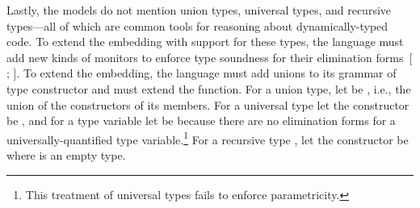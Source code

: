 \documentclass[screen=true, 10pt, acmsmall]{acmart}
\makeatletter
\newcommand{\sectionNewpage}{}
\newcommand{\Sendabbrev}[1]{#1\@}
\newcommand{\AutobibLink}[1]{\color{ACMPurple}{#1}}
\newcommand{\NoteBox}[1]{\footnote{#1}}
\newcommand{\NoteContent}[1]{#1}
\newcommand{\Autobibref}[1]{#1}
\providecommand{\AutobibLink}[1]{#1}
\newcommand{\holong}{higher-order}
\newcommand{\folong}{first-order}
\newcommand{\tagof}[1]{\lfloor #1 \rfloor}
\newcommand{\tall}[2]{\forall#1.\,#2}
\newcommand{\trec}[2]{\mu #1.\,#2}
\newcommand{\tempty}{\mathsf{Empty}}
\newcommand{\kany}{\mathsf{Any}}
\newcommand{\vsubst}[3]{#1[#2\!\leftarrow\!#3]}
\makeatother
\begin{document}
Lastly, the models do not mention union types, universal types,
 and recursive types{---}all of which are common tools for reasoning about
 dynamically{-}typed code.
To extend the \relax{\holong} embedding with support for these types, the language
 must add new kinds of monitors to enforce type soundness for their
 elimination forms\Autobibref{~[\hyperref[t:x28autobib_x22Tx2e_Stephen_Stricklandx2c_Sam_Tobinx2dHochstadtx2c_Robert_Bruce_Findlerx2c_and_Matthew_FlattChaperones_and_Impersonatorsx3a_Runx2dtime_Support_for_Reasonable_InterpositionConference_on_Objectx2dOriented_Programmingx2c_Systemsx2c_Languages_and_Applicationsx2c_ppx2e_943x2dx2d9622012x22x29]{\AutobibLink{Strickland et al\Sendabbrev{.}}} \hyperref[t:x28autobib_x22Tx2e_Stephen_Stricklandx2c_Sam_Tobinx2dHochstadtx2c_Robert_Bruce_Findlerx2c_and_Matthew_FlattChaperones_and_Impersonatorsx3a_Runx2dtime_Support_for_Reasonable_InterpositionConference_on_Objectx2dOriented_Programmingx2c_Systemsx2c_Languages_and_Applicationsx2c_ppx2e_943x2dx2d9622012x22x29]{\AutobibLink{2012}}; \hyperref[t:x28autobib_x22Asumu_Takikawax2c_Daniel_Felteyx2c_Earl_Deanx2c_Robert_Bruce_Findlerx2c_Matthew_Flattx2c_Sam_Tobinx2dHochstadtx2c_and_Matthias_FelleisenTowards_Practical_Gradual_TypingEuropean_Conference_on_Objectx2dOriented_Programmingx2c_ppx2e_4x2dx2d272015x22x29]{\AutobibLink{Takikawa et al\Sendabbrev{.}}} \hyperref[t:x28autobib_x22Asumu_Takikawax2c_Daniel_Felteyx2c_Earl_Deanx2c_Robert_Bruce_Findlerx2c_Matthew_Flattx2c_Sam_Tobinx2dHochstadtx2c_and_Matthias_FelleisenTowards_Practical_Gradual_TypingEuropean_Conference_on_Objectx2dOriented_Programmingx2c_ppx2e_4x2dx2d272015x22x29]{\AutobibLink{2015}}]}.
To extend the \relax{\folong} embedding, the language must add unions 
 to its grammar of type constructor and must extend the \relax{$\tagof{\cdot}$} function.
For a union type, let \relax{$\tagof{\tau_0 \cup \tau_1}$} be \relax{$\tagof{\tau_0} \cup \tagof{\tau_1}$},
 i.e., the union of the constructors of its members.
For a universal type \relax{$\tall{\alpha}{\tau}$} let the constructor be \relax{$\tagof{\tau}$},
 and for a type variable let \relax{$\tagof{\alpha}$} be \relax{$\kany$} because there are
 no elimination forms for a universally{-}quantified type variable.\NoteBox{\NoteContent{This
treatment of universal types fails to enforce parametricity.}}
For a recursive type \relax{$\trec{\alpha}{\tau}$}, let the constructor be
 \relax{$\tagof{\vsubst{\tau}{\alpha}{\tempty}}$} where \relax{$\tempty$} is an empty type.

\sectionNewpage
\end{document}
